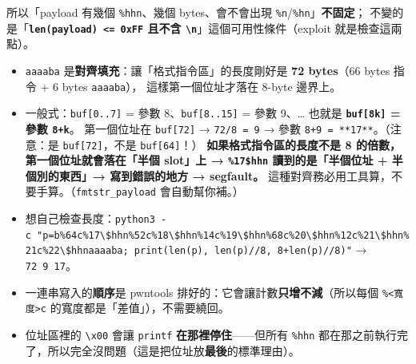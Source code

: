 \documentclass[10pt,a4paper]{article}
\providecommand{\tightlist}{%
  \setlength{\itemsep}{0pt}\setlength{\parskip}{0pt}}
\begin{document}
所以「payload 有幾個 \texttt{\%\allowbreak{}hhn}、幾個 bytes、會不會出現
\texttt{\%\allowbreak{}n}/\texttt{\%\allowbreak{}hn}」\textbf{不固定}；
不變的是「\textbf{\texttt{len(payload)\ \allowbreak{}\textless{}\allowbreak{}=\ \allowbreak{}0xFF} 且不含
\texttt{\textbackslash{}\allowbreak{}n}}」這個可用性條件（exploit 就是檢查這兩點）。

\begin{itemize}
\tightlist
\item
  \texttt{aaaaba} 是\textbf{對齊填充}：讓「格式指令區」的長度剛好是
  \textbf{72 bytes}（66 bytes 指令 + 6 bytes \texttt{aaaaba}），
  這樣第一個位址才落在 8-byte 邊界上。
\item
  一般式：\texttt{buf{[}0..\allowbreak{}7{]}} = 參數 8、\texttt{buf{[}8..\allowbreak{}15{]}} =
  參數 9、\ldots{} 也就是 \textbf{\texttt{buf{[}8k{]}} = 參數
  \texttt{8+k}}。 第一個位址在 \texttt{buf{[}72{]}} →
  \texttt{72/\allowbreak{}8\ \allowbreak{}=\ \allowbreak{}9} → 參數 \texttt{8+9\ \allowbreak{}=\ \allowbreak{}**17**}。（注意：是
  \texttt{buf{[}72{]}}，不是 \texttt{buf{[}64{]}}！）
  \textbf{如果格式指令區的長度不是 8 的倍數，第一個位址就會落在「半個
  slot」上 → \texttt{\%\allowbreak{}17\$\allowbreak{}hhn} 讀到的是「半個位址 + 半個別的東西」→
  寫到錯誤的地方 → segfault。}
  這種對齊務必用工具算，不要手算。（\texttt{fmtstr\_\allowbreak{}payload}
  會自動幫你補。）
\item
  想自己檢查長度：\texttt{python3\ \allowbreak{}-\allowbreak{}c\ \allowbreak{}"p=b\textquotesingle{}\allowbreak{}\%\allowbreak{}64c\%\allowbreak{}17\textbackslash{}\allowbreak{}\$\allowbreak{}hhn\%\allowbreak{}52c\%\allowbreak{}18\textbackslash{}\allowbreak{}\$\allowbreak{}hhn\%\allowbreak{}14c\%\allowbreak{}19\textbackslash{}\allowbreak{}\$\allowbreak{}hhn\%\allowbreak{}68c\%\allowbreak{}20\textbackslash{}\allowbreak{}\$\allowbreak{}hhn\%\allowbreak{}12c\%\allowbreak{}21\textbackslash{}\allowbreak{}\$\allowbreak{}hhn\%\allowbreak{}21c\%\allowbreak{}22\textbackslash{}\allowbreak{}\$\allowbreak{}hhnaaaaba\textquotesingle{}\allowbreak{};\ \allowbreak{}print(len(p),\allowbreak{}\ \allowbreak{}len(p)//\allowbreak{}8,\allowbreak{}\ \allowbreak{}8+len(p)//\allowbreak{}8)"}
  → \texttt{72\ \allowbreak{}9\ \allowbreak{}17}。
\item
  一連串寫入的\textbf{順序}是 pwntools
  排好的：它會讓計數\textbf{只增不減}（所以每個
  \texttt{\%\allowbreak{}\textless{}\allowbreak{}寬度\textgreater{}\allowbreak{}c}
  的寬度都是「差值」），不需要繞回。
\item
  位址區裡的 \texttt{\textbackslash{}\allowbreak{}x00} 會讓 \texttt{printf}
  \textbf{在那裡停住}------但所有 \texttt{\%\allowbreak{}hhn}
  都在那之前執行完了，所以完全沒問題（這是把位址放\textbf{最後}的標準理由）。
\end{itemize}
\end{document}
